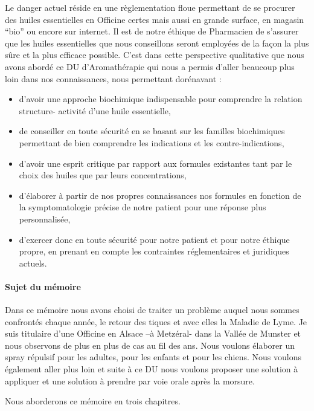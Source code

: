 \documentclass[12pt,a4wide]{article}
\begin{document}
Le danger  actuel réside en une  règlementation floue permettant de  se procurer
des huiles  essentielles en  Officine certes  mais aussi  en grande  surface, en
magasin ``bio'' ou encore sur internet. Il est de notre éthique de Pharmacien de
s'assurer que les  huiles essentielles que nous conseillons  seront employées de
la  façon  la  plus  sûre  et  la plus  efficace  possible.   C'est  dans  cette
perspective qualitative que  nous avons abordé ce DU d'Aromathérapie  qui nous a
permis  d'aller  beaucoup plus  loin  dans  nos connaissances,  nous  permettant
dorénavant :
\begin{itemize}
\item d'avoir une approche biochimique indispensable pour comprendre la relation
structure- activité d'une huile essentielle,
\item de conseiller en toute sécurité en se basant sur les familles biochimiques
permettant de bien comprendre les indications et les contre-indications,
\item d'avoir une  esprit critique par rapport  aux formules existantes tant  par le
choix des huiles que par leurs concentrations,
\item d'élaborer à partir de nos propres connaissances nos formules en fonction de
la symptomatologie précise de notre patient pour une réponse plus
personnalisée,
\item d'exercer donc en toute sécurité pour notre patient et pour notre
éthique propre, en prenant en compte les contraintes réglementaires et
juridiques actuels.\\
\end{itemize}


\paragraph{Sujet du mémoire}
\label{sec-1-0-0-2}
Dans ce  mémoire nous  avons choisi  de traiter un  problème auquel  nous sommes
confrontés chaque année, le retour des tiques  et avec elles la Maladie de Lyme.
Je  suis titulaire  d'une Officine  en  Alsace –à  Metzéral- dans  la Vallée  de
Munster et nous  observons de plus en plus  de cas au fil des  ans. Nous voulons
élaborer  un spray  répulsif pour  les  adultes, pour  les enfants  et pour  les
chiens. Nous  voulons également aller  plus loin et suite  à ce DU  nous voulons
proposer une solution à appliquer et une solution à prendre par voie orale après
la morsure.


Nous aborderons ce mémoire en trois chapitres.
\end{document}
